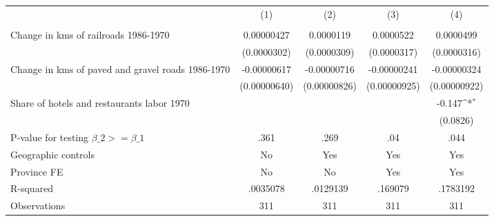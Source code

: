 {
\def\sym#1{\ifmmode^{#1}\else\(^{#1}\)\fi}
\begin{tabular}{l*{4}{c}}
\hline\hline
                &\multicolumn{1}{c}{(1)}&\multicolumn{1}{c}{(2)}&\multicolumn{1}{c}{(3)}&\multicolumn{1}{c}{(4)}\\
                &\multicolumn{1}{c}{}&\multicolumn{1}{c}{}&\multicolumn{1}{c}{}&\multicolumn{1}{c}{}\\
\hline
Change in kms of railroads 1986-1970&0.00000427         &0.0000119         &0.0000522         &0.0000499         \\
                &(0.0000302)         &(0.0000309)         &(0.0000317)         &(0.0000316)         \\
[1em]
Change in kms of paved and gravel roads 1986-1970&-0.00000617         &-0.00000716         &-0.00000241         &-0.00000324         \\
                &(0.00000640)         &(0.00000826)         &(0.00000925)         &(0.00000922)         \\
[1em]
Share of hotels and restaurants labor 1970&                  &                  &                  &   -0.147\sym{*}  \\
                &                  &                  &                  & (0.0826)         \\
\hline
P-value for testing $\beta\_{2} >= \beta\_{1}$&     .361         &     .269         &      .04         &     .044         \\
Geographic controls&       No         &      Yes         &      Yes         &      Yes         \\
Province FE     &       No         &       No         &      Yes         &      Yes         \\
R-squared       & .0035078         & .0129139         &  .169079         & .1783192         \\
Observations    &      311         &      311         &      311         &      311         \\
\hline\hline
\end{tabular}
}
